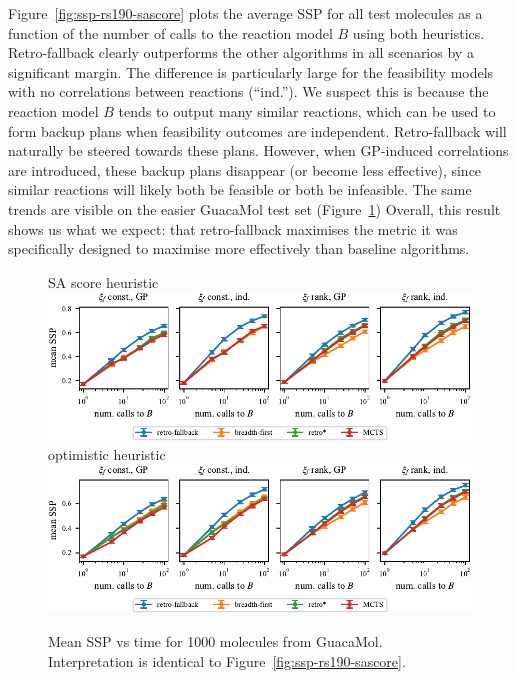Figure~\ref{fig:ssp-rs190-sascore} plots the average SSP for all test
molecules as a function of the number of calls to the reaction model $B$
using both heuristics.
Retro-fallback clearly outperforms the other algorithms in all scenarios
by a significant margin.
The difference is particularly large for the feasibility models
with no correlations between reactions (``ind.'').
We suspect this is because the reaction model $B$ tends to output
many similar reactions,
which can be used to form backup plans when feasibility outcomes are independent.
Retro-fallback will naturally be steered towards these plans.
However, when GP-induced correlations are introduced,
these backup plans disappear (or become less effective),
since similar reactions will likely both be feasible
or both be infeasible.
The same trends are visible
on the easier GuacaMol test set (Figure~\ref{fig:ssp-guacamol-all-heuristics})
Overall, this result shows us what we expect:
that retro-fallback maximises the metric it was specifically designed to maximise
more effectively than baseline algorithms.
\begin{figure}[htb]
    \centering
    {\large SA score heuristic} \\
    \vspace{0.3cm}
    \includegraphics{figures/comparison/guacamol/ssp_sascore.pdf} \\
    \vspace{0.3cm}
    {\large optimistic heuristic} \\
    \vspace{0.3cm}
    \includegraphics{figures/comparison/guacamol/ssp_optimistic.pdf}
    \caption[Mean SSP over time for GuacaMol molecules.]{
        Mean SSP vs time
        for 1000 molecules from GuacaMol.
        Interpretation is identical to 
        Figure~\ref{fig:ssp-rs190-sascore}.
    }
    \label{fig:ssp-guacamol-all-heuristics}
\end{figure}



